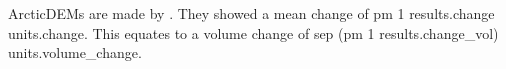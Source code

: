 \documentclass{article}
\begin{document}
ArcticDEMs are made by \citet{porter_arcticdem_2018}.
They showed a mean change of {{pm 1 results.change}} {{units.change}}.
This equates to a volume change of {{sep (pm 1 results.change_vol)}} {{units.volume_change}}.



\end{document}
